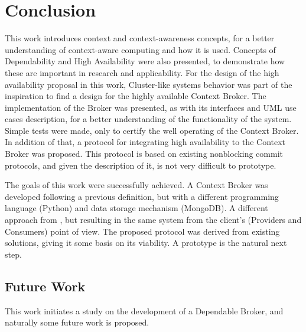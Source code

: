 \chapter{Conclusion}
\label{chap:conclusion}
This work introduces context and context-awareness concepts, for a better understanding of context-aware computing and how it is used. Concepts of Dependability and High Availability were also presented, to demonstrate how these are important in research and applicability. For the design of the high availability proposal in this work, Cluster-like systems behavior was part of the inspiration to find a design for the highly available Context Broker. The implementation of the Broker was presented, as with its interfaces and UML use cases description, for a better understanding of the functionality of the system. Simple tests were made, only to certify the well operating of the Context Broker. 
In addition of that, a protocol for integrating high availability to the Context Broker was proposed. This protocol is based on existing nonblocking commit protocols, and given the description of it, is not very difficult to prototype.

The goals of this work were successfully achieved. A Context Broker was developed following a previous definition, but with a different programming language (Python) and data storage mechanism (MongoDB). A different approach from \cite{crippa2010}, but resulting in the same system from the client's (Providers and Consumers) point of view. The proposed protocol was derived from existing solutions, giving it some basis on its viability. A prototype is the natural next step.




\section{Future Work}
This work initiates a study on the development of a Dependable Broker, and naturally some future work is proposed.

